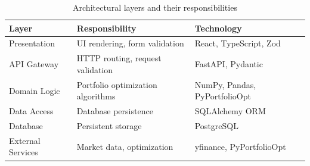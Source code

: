 \begin{table}[htbp]
\centering
\caption{Architectural layers and their responsibilities}
\label{tab:architecture}
\begin{tabular}{lll}
\hline
\textbf{Layer} & \textbf{Responsibility} & \textbf{Technology} \\
\hline
Presentation & UI rendering, form validation & React, TypeScript, Zod \\
API Gateway & HTTP routing, request validation & FastAPI, Pydantic \\
Domain Logic & Portfolio optimization algorithms & NumPy, Pandas, PyPortfolioOpt \\
Data Access & Database persistence & SQLAlchemy ORM \\
Database & Persistent storage & PostgreSQL \\
External Services & Market data, optimization & yfinance, PyPortfolioOpt \\
\hline
\end{tabular}
\end{table}

% 
